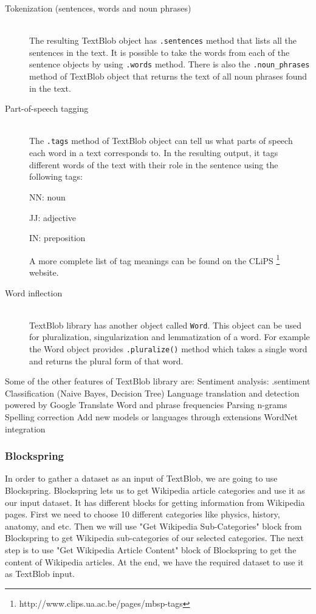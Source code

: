 \documentclass[a4paper]{article}
\begin{document}
\begin{description}
  \item[Tokenization (sentences, words and noun phrases)] \hfill \\
  The resulting TextBlob object has \texttt{.sentences} method that lists all the sentences in the text. It is possible to take the words from each of the sentence objects by using \texttt{.words} method. There is also the \texttt{.noun\_phrases} method of TextBlob object that returns the text of all noun phrases found in the text.
  
  \item[Part-of-speech tagging] \hfill \\
  The \texttt{.tags} method of TextBlob object can tell us what parts of speech each word in a text corresponds to. In the resulting output, it tags different words of the text with their role in the sentence using the following tags: 

  NN: noun

  JJ: adjective

  IN: preposition

  A more complete list of tag meanings can be found on the CLiPS  \footnote{http://www.clips.ua.ac.be/pages/mbsp-tags} website.
 
  \item[Word inflection] \hfill \\
  TextBlob library has another object called \texttt{Word}. This object can be used for pluralization, singularization and lemmatization of a word. For example the Word object provides \texttt{.pluralize()} method which takes a single word and returns the plural form of that word. 
  
\end{description}

Some of the other features of TextBlob library are:
Sentiment analysis: .sentiment
Classification (Naive Bayes, Decision Tree)
Language translation and detection powered by Google Translate
Word and phrase frequencies
Parsing
n-grams
Spelling correction
Add new models or languages through extensions
WordNet integration


\subsubsection{Blockspring}

In order to gather a dataset as an input of TextBlob, we are going to use Blockspring. Blockspring lets us to get Wikipedia article categories and use it as our input dataset. It has different blocks for getting information from Wikipedia pages. First we need to choose 10 different categories like physics, history, anatomy, and etc. Then we will use "Get Wikipedia Sub-Categories" block from Blockspring to get Wikipedia sub-categories of our selected categories. The next step is to use "Get Wikipedia Article Content" block of Blockspring to get the content of Wikipedia articles. At the end, we have the required dataset to use it as TextBlob input. 
\end{document}
